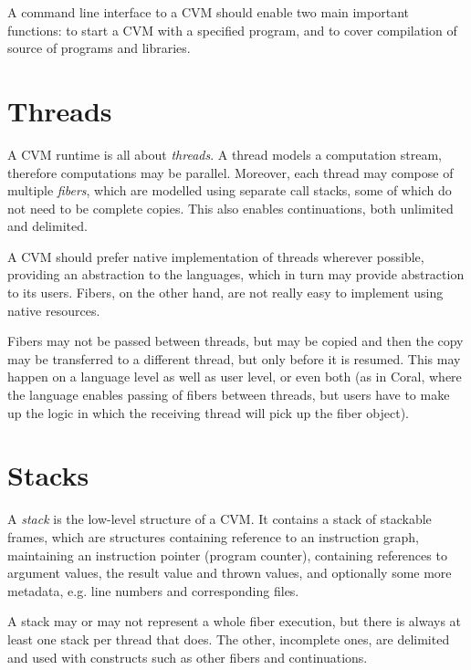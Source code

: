 A command line interface to a CVM should enable two main important functions: to start a CVM with a specified program, and to cover compilation of source of programs and libraries. 






\section{Threads}

A CVM runtime is all about {\em threads}. A thread models a computation stream, therefore computations may be parallel. Moreover, each thread may compose of multiple {\em fibers}, which are modelled using separate call stacks, some of which do not need to be complete copies. This also enables continuations, both unlimited and delimited. 

A CVM should prefer native implementation of threads wherever possible, providing an abstraction to the languages, which in turn may provide abstraction to its users. Fibers, on the other hand, are not really easy to implement using native resources. 

Fibers may not be passed between threads, but may be copied and then the copy may be transferred to a different thread, but only before it is resumed. This may happen on a language level as well as user level, or even both (as in Coral, where the language enables passing of fibers between threads, but users have to make up the logic in which the receiving thread will pick up the fiber object). 





\section{Stacks}

A {\em stack} is the low-level structure of a CVM. It contains a stack of stackable frames, which are structures containing reference to an instruction graph, maintaining an instruction pointer (program counter), containing references to argument values, the result value and thrown values, and optionally some more metadata, e.g. line numbers and corresponding files. 

A stack may or may not represent a whole fiber execution, but there is always at least one stack per thread that does. The other, incomplete ones, are delimited and used with constructs such as other fibers and continuations. 

